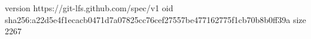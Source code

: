 version https://git-lfs.github.com/spec/v1
oid sha256:a22d5e4f1ecacb0471d7a07825cc76cef27557be477162775f1cb70b8b0ff39a
size 2267
